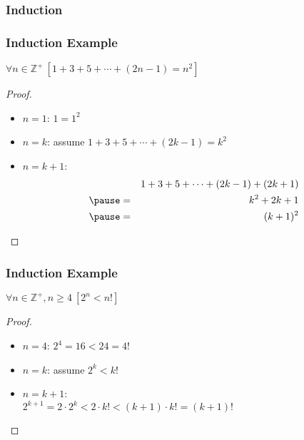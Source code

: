 \documentclass[dvipsnames]{beamer}
\begin{document}
\begin{frame}
  \frametitle{Induction}

  \begin{center}
  \end{center}
\end{frame}

\begin{frame}
  \frametitle{Induction Example}

  \begin{theorem}
    $\forall n \in \mathbb{Z}^+~[1+3+5+\cdots+(2n-1)=n^2]$
  \end{theorem}

  \pause
  \begin{proof}
    \begin{itemize}
      \item $n=1$: $1=1^2$

      \pause
      \item $n=k$: assume $1+3+5+\cdots+(2k-1)=k^2$

      \pause
      \item $n=k+1$:
      \begin{eqnarray*}
        &   & 1+3+5+\cdots+(2k-1)+(2k+1)\\\pause
        & = & k^2+2k+1\\\pause
        & = & (k+1)^2
      \end{eqnarray*}
    \end{itemize}
  \end{proof}
\end{frame}

\begin{frame}
  \frametitle{Induction Example}

  \begin{theorem}
    $\forall n \in \mathbb{Z}^+, n \geq 4~[2^n < n!]$
  \end{theorem}

  \pause
  \begin{proof}
    \begin{itemize}
      \item $n=4$: $2^4=16<24=4!$

      \pause
      \item $n=k$: assume $2^k < k!$

      \pause
      \item $n=k+1$:\\
        $2^{k+1} = 2 \cdot 2^k < 2 \cdot k! < (k+1) \cdot k! = (k+1)!$
    \end{itemize}
  \end{proof}
\end{frame}
\end{document}
